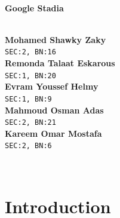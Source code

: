 \documentclass[a4paper,12pt]{article}
\begin{document}
\begin{titlepage}

\HRule \\[0.4cm]
{ \huge \bfseries Google Stadia}\\[0.4cm] %
\HRule \\[1cm]
 
\begin{minipage}{0.8\textwidth}
\begin{flushleft} 
\textbf{Mohamed Shawky Zaky} \\
\texttt{SEC:2, BN:16} \\[0.5cm]

\textbf{Remonda Talaat Eskarous} \\
\texttt{SEC:1, BN:20} \\[0.5cm]

\textbf{Evram Youssef Helmy} \\
\texttt{SEC:1, BN:9} \\[0.5cm]

\textbf{Mahmoud Osman Adas} \\
\texttt{SEC:2, BN:21} \\[0.5cm]

\textbf{Kareem Omar Mostafa} \\
\texttt{SEC:2, BN:6} \\[0.5cm]
\end{flushleft}
\end{minipage}\\[6cm]

\end{titlepage}

\thispagestyle{empty}

\tableofcontents
\listoffigures
\clearpage


\section{Introduction}

\newpage
\end{document}
